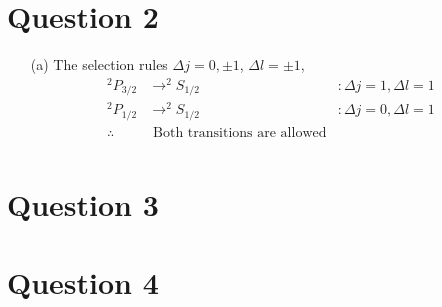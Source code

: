 \documentclass[10pt,a4paper]{article}
\begin{document}
\section*{Question 2}
\begin{itemize}
	\item[(a)] The selection rules $\Delta j = 0, \pm 1$, $\Delta l = \pm 1$,
		\begin{align*}
			^{2}P_{3/2} &\rightarrow ^{2}S_{1/2} &: \Delta j = 1, \Delta l = 1  \\
			^{2}P_{1/2} &\rightarrow ^{2}S_{1/2} &: \Delta j = 0, \Delta l = 1  \\
			\therefore &\mbox{ Both transitions are allowed}& \\
		\end{align*}
\end{itemize}

\section*{Question 3}
\section*{Question 4}
\end{document}
